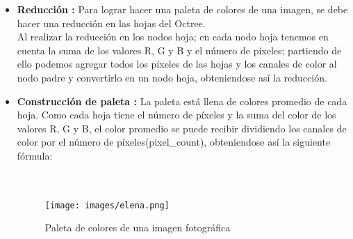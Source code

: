 \begin{itemize}
    \newpage
    \item \textbf{Reducción :}
    Para lograr hacer una paleta de colores de una imagen, se debe hacer una reducción en las hojas del Octree.\\
    Al realizar la reducción en los nodos hoja; en cada nodo hoja tenemos en cuenta la suma de los valores R, G y B y el número de píxeles; partiendo de ello podemos agregar todos los píxeles de las hojas y los canales de color al nodo padre y convertirlo en un nodo hoja, obteniendose así la reducción.\\

    \item \textbf{Construcción de paleta :}
    La paleta está llena de colores promedio de cada hoja. Como cada hoja tiene el número de píxeles y la suma del color de los valores R, G y B, el color promedio se puede recibir dividiendo los canales de color por el número de píxeles(pixel\_count), obteniendose así la siguiente fórmula: \\
    \\
    \\
   
    \begin{figure}[H]
      \centering
      \texttt{[image: images/elena.png]}
      \caption{Paleta de colores de una imagen fotográfica}
      \label{fig:act-5}
    \end{figure}   
    
    
\end{itemize}
